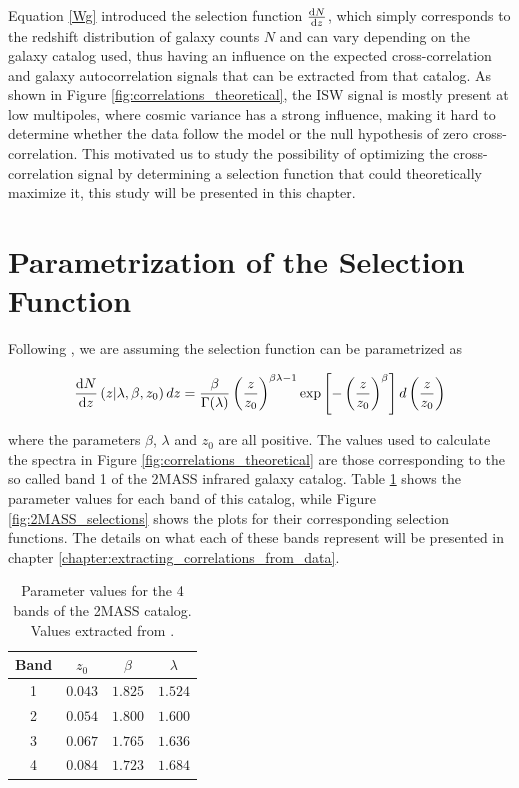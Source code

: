 \documentclass[openany,a4paper,12pt,oneside]{book}
\begin{document}
\begin{spacing}{1.5}
Equation \eqref{Wg} introduced the selection function $\dv{N}{z}$, which simply corresponds to the redshift distribution of galaxy counts $N$ and can vary depending on the galaxy catalog used, thus having an influence on the expected cross-correlation and galaxy autocorrelation signals that can be extracted from that catalog. As shown in Figure \ref{fig:correlations_theoretical}, the ISW signal is mostly present at low multipoles, where cosmic variance has a strong influence, making it hard to determine whether the data follow the model or the null hypothesis of zero cross-correlation. This motivated us to study the possibility of optimizing the cross-correlation signal by determining a selection function that could theoretically maximize it, this study will be presented in this chapter.

\section{Parametrization of the Selection Function}\label{sect:sel_func_par}

Following \cite{cross_corr:Afshordi}, we are assuming the selection function can be parametrized as

\begin{equation}\label{select_func_par}
\dv{N}{z}\left(z|\lambda, \beta, z_0\right)dz=\frac{\beta}{\Gamma(\lambda)}\left(\frac{z}{z_0}\right)^{\beta\lambda-1}\text{exp}\left[-\left(\frac{z}{z_0}\right)^\beta\right]d\left(\frac{z}{z_0}\right)
\end{equation}

\noindent where the parameters $\beta$, $\lambda$ and $z_0$ are all positive. The values used to calculate the spectra in Figure \ref{fig:correlations_theoretical} are those corresponding to the so called band 1 of the 2MASS infrared galaxy catalog. Table \ref{tab:bands_2MASS} shows the parameter values for each band of this catalog, while Figure \ref{fig:2MASS_selections} shows the plots for their corresponding selection functions. The details on what each of these bands represent will be presented in chapter \ref{chapter:extracting_correlations_from_data}.

\begin{table}[!htb]
\centering
    \begin{tabular}{cccc} \hline
     Band & $z_0$ & $\beta$ & $\lambda$ \\ \hline
     1 & $0.043$ & $1.825$ & $1.524$\\
     2 & $0.054$ & $1.800$ & $1.600$ \\
     3 & $0.067$ & $1.765$ & $1.636$\\
     4 & $0.084$ & $1.723$ & $1.684$\\ \hline
    \end{tabular}
    \caption{Parameter values for the 4 bands of the 2MASS catalog. Values extracted from \cite{cross_corr:Afshordi}.}
    \label{tab:bands_2MASS}
\end{table}


\end{spacing}
\end{document}
